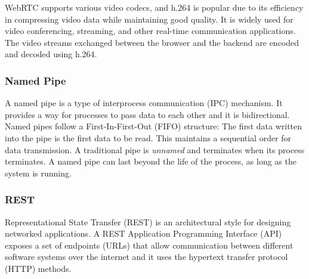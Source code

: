 \documentclass[../MasterThesis.tex]{subfiles}
\begin{document}
WebRTC supports various video codecs, and h.264 is popular due to its efficiency in compressing video data while maintaining good quality. It is widely used for video conferencing, streaming, and other real-time communication applications. The video streams exchanged between the browser and the backend are encoded and decoded using h.264.














\subsubsection*{Named Pipe} 

A named pipe is a type of interprocess communication (IPC) mechanism. It provides a way for processes to pass data to each other and it is bidirectional. 
Named pipes follow a First-In-First-Out (FIFO) structure: The first data written into the pipe is the first data to be read. This maintains a sequential order for data transmission.
A traditional pipe is \textit{unnamed} and terminates when its process terminates. A named pipe can last beyond the life of the process, as long as the system is running.~\cite{namedpipe}









\subsubsection*{REST} 


Representational State Transfer (REST) is an architectural style for designing networked applications. A REST Application Programming Interface (API) exposes a set of endpoints (URLs) that allow communication between different software systems over the internet and it uses the hypertext transfer protocol (HTTP) methods.~\cite{IEEE_Rest, webservice, Nodejs_Rest}
\end{document}
